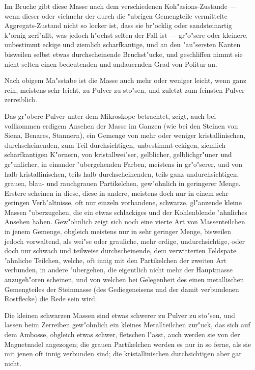 \documentclass[a4paper, 11pt, oneside, german]{article}
\begin{document}
Im Bruche gibt diese Masse nach dem verschiedenen Koh"asions-Zustande --- wenn dieser oder vielmehr der durch die "ubrigen Gemengteile vermittelte Aggregats-Zustand nicht so locker ist, dass sie br"ocklig oder sandsteinartig k"ornig zerf"allt, was jedoch h"ochst selten der Fall ist --- gr"o"sere oder kleinere, unbestimmt eckige und ziemlich scharfkantige, und an den "au"sersten Kanten bisweilen selbst etwas durchscheinende Bruchst"ucke, und geschliffen nimmt sie nicht selten einen bedeutenden und andauernden Grad von Politur an.

Nach obigem Ma"sstabe ist die Masse auch mehr oder weniger leicht, wenn ganz rein, meistens sehr leicht, zu Pulver zu sto"sen, und zuletzt zum feinsten Pulver zerreiblich.

Das gr"obere Pulver unter dem Mikroskope betrachtet, zeigt, auch bei vollkommen erdigem Ansehen der Masse im Ganzen (wie bei den Steinen von Siena, Benares, Stannern), ein Gemenge von mehr oder weniger kristallinischen, durchscheinenden, zum Teil durchsichtigen, unbestimmt eckigen, ziemlich scharfkantigen K"ornern, von kristallwei"ser, gelblicher, gelblichgr"uner und gr"unlicher, in einander "ubergehenden Farben, meistens in gr"o"serer, und von halb kristallinischen, teils halb durchscheinenden, teils ganz undurchsichtigen, grauen, blau- und rauchgrauen Partikelchen, gew"ohnlich in geringerer Menge. Erstere scheinen in diese, diese in andere, meistens doch nur in einem sehr geringen Verh"altnisse, oft nur einzeln vorhandene, schwarze, gl"anzende kleine Massen "uberzugehen, die ein etwas schlackiges und der Kohlenblende "ahnliches Ansehen haben. Gew"ohnlich zeigt sich noch eine vierte Art von Massenteilchen in jenem Gemenge, obgleich meistens nur in sehr geringer Menge, bisweilen jedoch vorwaltend, als wei"se oder grauliche, mehr erdige, undurchsichtige, oder doch nur schwach und teilweise durchscheinende, dem verwitterten Feldspate "ahnliche Teilchen, welche, oft innig mit den Partikelchen der zweiten Art verbunden, in andere "ubergehen, die eigentlich nicht mehr der Hauptmasse anzugeh"oren scheinen, und von welchen bei Gelegenheit des einen metallischen Gemengteiles der Steinmasse (des Gediegeneisens und der damit verbundenen Rostflecke) die Rede sein wird.

Die kleinen schwarzen Massen sind etwas schwerer zu Pulver zu sto"sen, und lassen beim Zerreiben gew"ohnlich ein kleines Metallteilchen zur"uck, das sich auf dem Ambosse, obgleich etwas schwer, fletschen l"asst, auch werden sie von der Magnetnadel angezogen; die grauen Partikelchen werden es nur in so ferne, als sie mit jenen oft innig verbunden sind; die kristallinischen durchsichtigen aber gar nicht.
\end{document}
